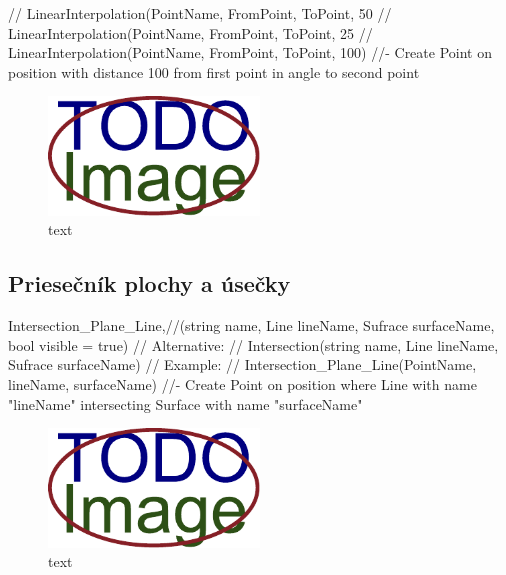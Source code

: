 
		//		LinearInterpolation(PointName, FromPoint, ToPoint, 50%
		//		LinearInterpolation(PointName, FromPoint, ToPoint, 25%
		//		LinearInterpolation(PointName, FromPoint, ToPoint, 100)	//- Create Point on position with distance 100 from first point in angle to second point 

\begin{figure}[H]
	\centering
	\includegraphics[width=0.5\textwidth]{obrazky-figures/placeholder.pdf}
	\caption{text}
	\label{fig:1}
\end{figure}

\subsection{Priesečník plochy a úsečky}
		Intersection\_Plane\_Line,//(string name, Line lineName, Sufrace surfaceName, bool visible = true)
		//	Alternative:
		//	Intersection(string name, Line lineName, Sufrace surfaceName)
		//	Example:
		//		Intersection\_Plane\_Line(PointName,  lineName, surfaceName) //- Create Point on position where Line with name "lineName" intersecting Surface with name "surfaceName"
\begin{figure}[H]
	\centering
	\includegraphics[width=0.5\textwidth]{obrazky-figures/placeholder.pdf}
	\caption{text}
	\label{fig:1}
\end{figure}


